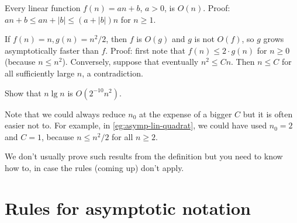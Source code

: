 \begin{Boxample}
Every linear function $f(n) = an + b$, $a > 0$, is $O(n)$. Proof: 
$an + b \leq an + |b| \leq (a + |b|) n$ for $n \geq 1$. 
\end{Boxample}

\begin{Boxample} 
\label{eg:asymp-lin-quadrat}
If $f(n) = n, g(n) = n^2/2$, then $f$ is $O(g)$ and $g$ is not
$O(f)$, so $g$ grows asymptotically faster than $f$. Proof: 
first note that $f(n) \leq 2 \cdot g(n)$ for $n\geq 0$ (because $n\leq n^2$). Conversely, suppose 
that eventually $n^2 \leq Cn$. Then $n \leq C$ for all sufficiently large $n$, 
a contradiction.
\end{Boxample}

\begin{Boxample}[4]
Show that $n \lg n$ is $O(2^{-10} n^2)$.
\end{Boxample}

Note that we could always reduce $n_0$ at the expense of a bigger $C$ but 
it is often easier not to. For example, in \cref{eg:asymp-lin-quadrat}, we could have used 
$n_0 = 2$ and $C = 1$, because $n\leq n^2/2$ for all $n\geq 2$.

We don't usually prove such results from the definition but you
need to know how to, in case the rules (coming up) don't apply.

\section{Rules for asymptotic notation}

